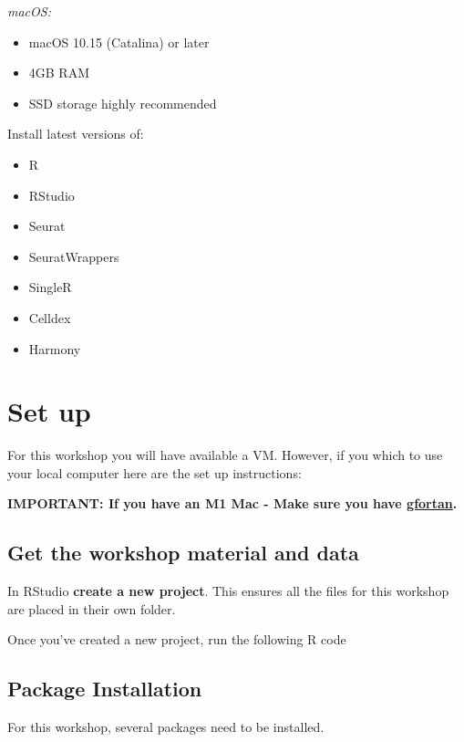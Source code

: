 \documentclass[
]{book}
\providecommand{\tightlist}{%
  \setlength{\itemsep}{0pt}\setlength{\parskip}{0pt}}
\begin{document}
\emph{macOS:}

\begin{itemize}
\tightlist
\item
  macOS 10.15 (Catalina) or later
\item
  4GB RAM
\item
  SSD storage highly recommended
\end{itemize}

Install latest versions of:

\begin{itemize}
\tightlist
\item
  R
\item
  RStudio
\item
  Seurat
\item
  SeuratWrappers
\item
  SingleR
\item
  Celldex
\item
  Harmony
\end{itemize}

\hypertarget{set-up}{%
\chapter{Set up}\label{set-up}}

For this workshop you will have available a VM. However, if you which to use your local computer here are the set up instructions:

\textbf{IMPORTANT: If you have an M1 Mac - Make sure you have \href{https://mac.r-project.org/tools/}{gfortan}.}

\hypertarget{get-the-workshop-material-and-data}{%
\section{Get the workshop material and data}\label{get-the-workshop-material-and-data}}

In RStudio \textbf{create a new project}. This ensures all the files for this workshop are placed in their own folder.

Once you've created a new project, run the following R code

\hypertarget{package-installation}{%
\section{Package Installation}\label{package-installation}}

For this workshop, several packages need to be installed.
\end{document}
